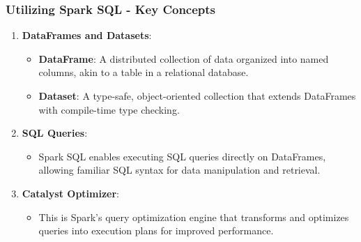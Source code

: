 \documentclass[aspectratio=169]{beamer}
\begin{document}
\begin{frame}[fragile]
    \frametitle{Utilizing Spark SQL - Key Concepts}
    \begin{enumerate}
        \item \textbf{DataFrames and Datasets}:
        \begin{itemize}
            \item \textbf{DataFrame}: A distributed collection of data organized into named columns, akin to a table in a relational database.
            \item \textbf{Dataset}: A type-safe, object-oriented collection that extends DataFrames with compile-time type checking.
        \end{itemize}
        
        \item \textbf{SQL Queries}:
        \begin{itemize}
            \item Spark SQL enables executing SQL queries directly on DataFrames, allowing familiar SQL syntax for data manipulation and retrieval.
        \end{itemize}

        \item \textbf{Catalyst Optimizer}:
        \begin{itemize}
            \item This is Spark's query optimization engine that transforms and optimizes queries into execution plans for improved performance.
        \end{itemize}
    \end{enumerate}
\end{frame}
\end{document}
